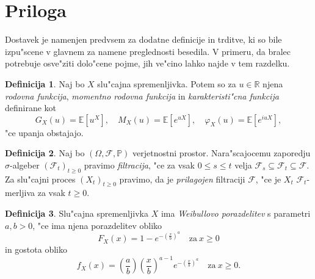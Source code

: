 \documentclass[12pt, a4paper, reqno]{amsart}
\theoremstyle{definition}
\newtheorem{definicija}{Definicija}[section]
\theoremstyle{plain}
\newcommand{\R}{\mathbb{R}}
\newcommand{\E}{\mathbb{E}}
\newcommand{\Prob}{\mathbb{P}}
\newcommand{\1}{\mathds{1}}
\begin{document}
        
        
        





\pagebreak

\section{Priloga}
    Dostavek je namenjen predvsem za dodatne definicije in trditve, ki so bile izpu"scene v glavnem
    za namene preglednosti besedila. V primeru, da bralec potrebuje osve"ziti dolo"cene pojme, 
    jih ve"cino lahko najde v tem razdelku.
    \begin{definicija}
        Naj bo $X$ slu"cajna spremenljivka. Potem so za $u\in\R$ njena \textit{rodovna funkcija}, 
        \textit{momentno rodovna funkcija} in \textit{karakteristi"cna funkcija} definirane 
        kot 
        \begin{equation*}
            G_X(u) = \E\left[u^X\right], \quad M_X(u) = \E\left[e^{uX}\right], \quad \varphi_X(u) = \E\left[e^{iuX}\right],
        \end{equation*}
        "ce upanja obstajajo.
        \label{def:rodovneFunkcije}
    \end{definicija}

    \begin{definicija}
        Naj bo $(\Omega, \mathcal{F}, \Prob)$ verjetnostni prostor. Nara"scajocemu zaporedju 
        $\sigma$-algeber $(\mathcal{F}_t)_{t\geq0}$ pravimo \textit{filtracija}, "ce za vsak $ 0\leq s\leq t$ velja
     $\mathcal{F}_s \subseteq \mathcal{F}_{t} \subseteq \mathcal{F}.$ Za slu"cajni proces $(X_t)_{t\geq0}$ pravimo, 
     da je \textit{prilagojen} filtraciji $\mathcal{F}$, "ce je $X_t$ $\mathcal{F}_t$-merljiva za vsak $t\geq0$.
     \label{def:filtracija}
    \end{definicija}

    \begin{definicija}
        Slu"cajna spremenljivka $X$ ima \textit{Weibullovo porazdelitev} s parametri $a, b > 0$, 
        "ce ima njena porazdelitev obliko 
        \begin{equation*}
            F_X(x) = 1 - e^{-\left(\tfrac{x}{b}\right)^a} \quad \text{za} \ x\geq 0
        \end{equation*}
        in gostota obliko
        \begin{equation*}
            f_X(x) = \left(\frac{a}{b}\right)\left(\frac{x}{b}\right)^{a-1}e^{-\left(\tfrac{x}{b}\right)^a} \quad \text{za} \ x\geq 0.
        \end{equation*}
        \label{def:WeibullovaPorazdelitev}
    \end{definicija}
\end{document}
